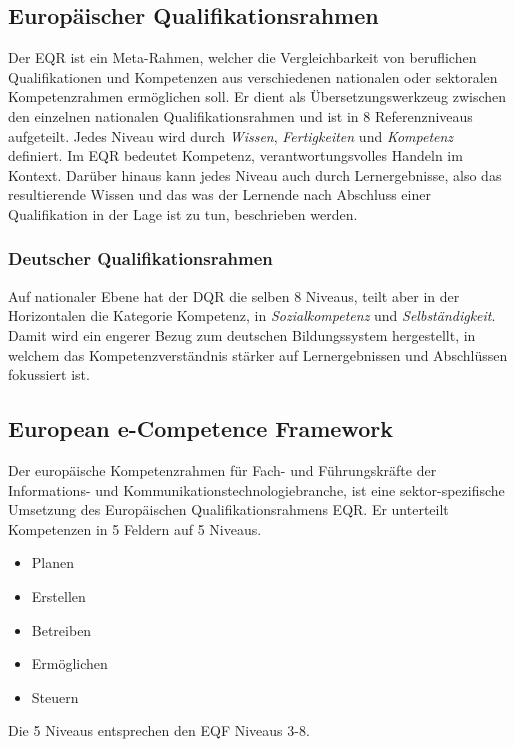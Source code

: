 \vspace{1em}
\subsection{Europäischer Qualifikationsrahmen}
Der EQR ist ein Meta-Rahmen, welcher die Vergleichbarkeit von beruflichen Qualifikationen und Kompetenzen aus verschiedenen nationalen oder sektoralen Kompetenzrahmen ermöglichen soll. Er dient als Übersetzungswerkzeug zwischen den einzelnen nationalen  Qualifikationsrahmen und ist in 8 Referenzniveaus aufgeteilt. Jedes Niveau wird durch  \textit{Wissen}, \textit{Fertigkeiten} und \textit{Kompetenz} definiert. Im EQR bedeutet Kompetenz, verantwortungsvolles Handeln im Kontext. Darüber hinaus kann jedes Niveau auch durch Lernergebnisse, also das resultierende Wissen und das was der Lernende nach Abschluss einer Qualifikation in der Lage ist zu tun, beschrieben werden. 

\subsubsection{Deutscher Qualifikationsrahmen}

Auf nationaler Ebene hat der DQR die selben 8 Niveaus, teilt aber in der Horizontalen die  Kategorie Kompetenz, in \textit{Sozialkompetenz} und \textit{Selbständigkeit}. Damit wird ein engerer Bezug zum deutschen Bildungssystem hergestellt, in welchem das Kompetenzverständnis  stärker auf Lernergebnissen und Abschlüssen fokussiert ist.
\subsection{European e-Competence Framework}\label{e-CF}

Der europäische Kompetenzrahmen für Fach- und Führungskräfte der Informations- und Kommunikationstechnologiebranche, ist eine sektor-spezifische Umsetzung des Europäischen Qualifikationsrahmens EQR. Er unterteilt Kompetenzen in 5 Feldern auf 5 Niveaus. 
\vspace{1em}
\begin{itemize}
	\item Planen
	\item Erstellen
	\item Betreiben
	\item Ermöglichen
	\item Steuern
\end{itemize}

\vspace{1em}
Die 5 Niveaus entsprechen den EQF Niveaus 3-8. 
